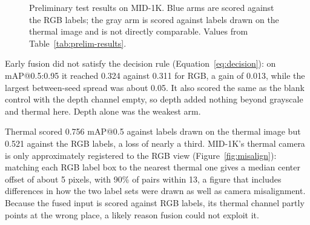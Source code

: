 \begin{figure}[htbp]
\centering
{}
\caption[Preliminary test results on MID-1K]{Preliminary test results on MID-1K. Blue arms are scored against the RGB
labels; the gray arm is scored against labels drawn on the thermal image and is
not directly comparable. Values from Table~\ref{tab:prelim-results}.}
\label{fig:prelim-chart}
\end{figure}

Early fusion did not satisfy the decision rule (Equation~\ref{eq:decision}): on
mAP@0.5:0.95 it reached 0.324 against 0.311 for RGB, a gain of 0.013, while the
largest between-seed spread was about 0.05. It also scored the same as the blank
control with the depth channel empty, so depth added nothing beyond grayscale and
thermal here. Depth alone was the weakest arm.

Thermal scored 0.756 mAP@0.5 against labels drawn on the thermal image but 0.521
against the RGB labels, a loss of nearly a third. MID-1K's thermal camera is only
approximately registered to the RGB view (Figure~\ref{fig:misalign}): matching
each RGB label box to the nearest thermal one gives a median center offset of
about 5 pixels, with 90\% of pairs within 13, a figure that includes differences
in how the two label sets were drawn as well as camera misalignment. Because the
fused input is scored against RGB labels, its thermal channel partly points at
the wrong place, a likely reason fusion could not exploit it.

